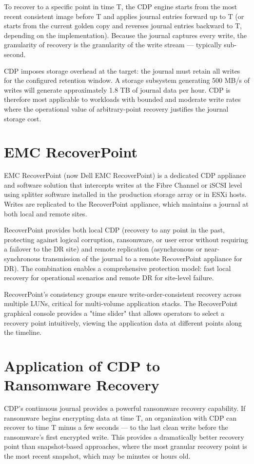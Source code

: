 To recover to a specific point in time T, the CDP engine starts from the most recent consistent image before T and applies journal entries forward up to T (or starts from the current golden copy and reverses journal entries backward to T, depending on the implementation). Because the journal captures every write, the granularity of recovery is the granularity of the write stream --- typically sub-second.

CDP imposes storage overhead at the target: the journal must retain all writes for the configured retention window. A storage subsystem generating 500 MB/s of writes will generate approximately 1.8 TB of journal data per hour. CDP is therefore most applicable to workloads with bounded and moderate write rates where the operational value of arbitrary-point recovery justifies the journal storage cost.

\section{EMC RecoverPoint}
EMC RecoverPoint (now Dell EMC RecoverPoint) is a dedicated CDP appliance and software solution that intercepts writes at the Fibre Channel or iSCSI level using splitter software installed in the production storage array or in ESXi hosts. Writes are replicated to the RecoverPoint appliance, which maintains a journal at both local and remote sites.

RecoverPoint provides both local CDP (recovery to any point in the past, protecting against logical corruption, ransomware, or user error without requiring a failover to the DR site) and remote replication (asynchronous or near-synchronous transmission of the journal to a remote RecoverPoint appliance for DR). The combination enables a comprehensive protection model: fast local recovery for operational scenarios and remote DR for site-level failure.

RecoverPoint's consistency groups ensure write-order-consistent recovery across multiple LUNs, critical for multi-volume application stacks. The RecoverPoint graphical console provides a "time slider" that allows operators to select a recovery point intuitively, viewing the application data at different points along the timeline.

\section{Application of CDP to Ransomware Recovery}
CDP's continuous journal provides a powerful ransomware recovery capability. If ransomware begins encrypting data at time T, an organization with CDP can recover to time T minus a few seconds --- to the last clean write before the ransomware's first encrypted write. This provides a dramatically better recovery point than snapshot-based approaches, where the most granular recovery point is the most recent snapshot, which may be minutes or hours old.

